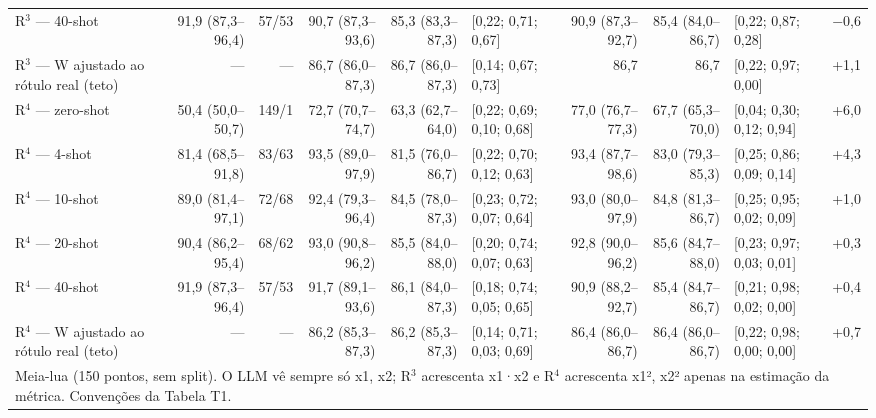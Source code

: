 \begin{table}[htbp]
\begin{tabular}{lrrrrlrrlr}
R$^3$ — 40-shot & 91,9 (87,3–96,4) & 57/53 & 90,7 (87,3–93,6) & 85,3 (83,3–87,3) & [0,22; 0,71; 0,67] & 90,9 (87,3–92,7) & 85,4 (84,0–86,7) & [0,22; 0,87; 0,28] & $-$0,6 \\
R$^3$ — W ajustado ao rótulo real (teto) & — & — & 86,7 (86,0–87,3) & 86,7 (86,0–87,3) & [0,14; 0,67; 0,73] & 86,7 & 86,7 & [0,22; 0,97; 0,00] & +1,1 \\
\midrule
R$^4$ — zero-shot & 50,4 (50,0–50,7) & 149/1 & 72,7 (70,7–74,7) & 63,3 (62,7–64,0) & [0,22; 0,69; 0,10; 0,68] & 77,0 (76,7–77,3) & 67,7 (65,3–70,0) & [0,04; 0,30; 0,12; 0,94] & +6,0 \\
R$^4$ — 4-shot & 81,4 (68,5–91,8) & 83/63 & 93,5 (89,0–97,9) & 81,5 (76,0–86,7) & [0,22; 0,70; 0,12; 0,63] & 93,4 (87,7–98,6) & 83,0 (79,3–85,3) & [0,25; 0,86; 0,09; 0,14] & +4,3 \\
R$^4$ — 10-shot & 89,0 (81,4–97,1) & 72/68 & 92,4 (79,3–96,4) & 84,5 (78,0–87,3) & [0,23; 0,72; 0,07; 0,64] & 93,0 (80,0–97,9) & 84,8 (81,3–86,7) & [0,25; 0,95; 0,02; 0,09] & +1,0 \\
R$^4$ — 20-shot & 90,4 (86,2–95,4) & 68/62 & 93,0 (90,8–96,2) & 85,5 (84,0–88,0) & [0,20; 0,74; 0,07; 0,63] & 92,8 (90,0–96,2) & 85,6 (84,7–88,0) & [0,23; 0,97; 0,03; 0,01] & +0,3 \\
R$^4$ — 40-shot & 91,9 (87,3–96,4) & 57/53 & 91,7 (89,1–93,6) & 86,1 (84,0–87,3) & [0,18; 0,74; 0,05; 0,65] & 90,9 (88,2–92,7) & 85,4 (84,7–86,7) & [0,21; 0,98; 0,02; 0,00] & +0,4 \\
R$^4$ — W ajustado ao rótulo real (teto) & — & — & 86,2 (85,3–87,3) & 86,2 (85,3–87,3) & [0,14; 0,71; 0,03; 0,69] & 86,4 (86,0–86,7) & 86,4 (86,0–86,7) & [0,22; 0,98; 0,00; 0,00] & +0,7 \\
\bottomrule
\multicolumn{10}{p{0.95\linewidth}}{\footnotesize Meia-lua (150 pontos, sem split). O LLM vê sempre só x1, x2; R$^3$ acrescenta x1·x2 e R$^4$ acrescenta x1², x2² apenas na estimação da métrica. Convenções da Tabela T1.} \\
\end{tabular}
\end{table}
